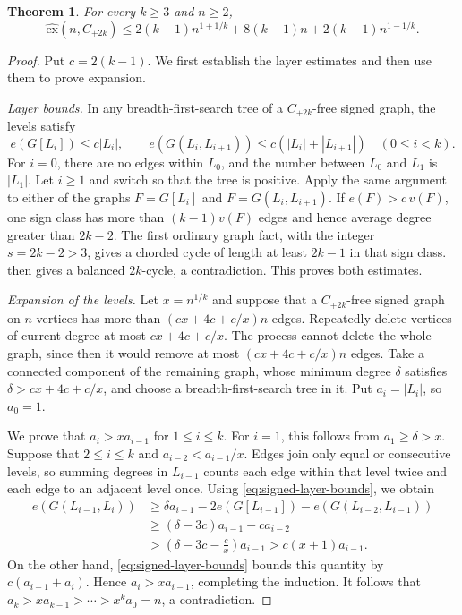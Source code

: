 \documentclass{article}
\newcommand{\ex}{\mathrm{ex}}
\newcommand{\hex}{\widehat{\ex}}
\newtheorem{theorem}{Theorem}[section]
\theoremstyle{definition}
\theoremstyle{remark}
\begin{document}
\begin{theorem}\label{thm:signed-BFS-bound}
For every $k\geq3$ and $n\geq2$,
\[
\hex(n,C_{+2k})\leq
2(k-1)n^{1+1/k}+8(k-1)n+2(k-1)n^{1-1/k}.
\]
\end{theorem}
\begin{proof}
Put $c=2(k-1)$.  We first establish the layer estimates and then use them
to prove expansion.

\emph{Layer bounds.}  In any breadth-first-search tree of a
$C_{+2k}$-free signed graph, the levels satisfy
\begin{equation}\label{eq:signed-layer-bounds}
e(G[L_i])\leq c|L_i|,\qquad
e(G(L_i,L_{i+1}))\leq c(|L_i|+|L_{i+1}|)
\quad(0\leq i<k).
\end{equation}
For $i=0$, there are no edges within $L_0$, and the number between $L_0$
and $L_1$ is $|L_1|$.  Let $i\geq1$ and switch so that the tree is
positive.  Apply the same argument to either of the graphs
$F=G[L_i]$ and $F=G(L_i,L_{i+1})$.  If $e(F)>c\,v(F)$, one sign class
has more than $(k-1)v(F)$ edges and hence average degree greater than
$2k-2$.  The first ordinary graph fact, with the integer $s=2k-2>3$,
gives a chorded cycle of length at least $2k-1$ in that sign class.
 then gives a balanced $2k$-cycle,
a contradiction.  This proves both estimates.

\emph{Expansion of the levels.}  Let $x=n^{1/k}$ and suppose that a
$C_{+2k}$-free signed graph on $n$
vertices has more than $(cx+4c+c/x)n$ edges.  Repeatedly delete vertices
of current degree at most $cx+4c+c/x$.  The process cannot delete the
whole graph, since then it would remove at most $(cx+4c+c/x)n$ edges.
Take a connected component of the remaining graph, whose minimum degree
$\delta$ satisfies $\delta>cx+4c+c/x$, and choose a breadth-first-search
tree in it.  Put $a_i=|L_i|$, so $a_0=1$.

We prove that $a_i>xa_{i-1}$ for $1\leq i\leq k$.  For $i=1$, this
follows from $a_1\geq\delta>x$.  Suppose that $2\leq i\leq k$ and
$a_{i-2}<a_{i-1}/x$.  Edges join only equal or consecutive levels, so
summing degrees in $L_{i-1}$ counts each edge within that level twice and
each edge to an adjacent level once.  Using
\eqref{eq:signed-layer-bounds}, we obtain
\begin{align*}
e(G(L_{i-1},L_i))
&\geq\delta a_{i-1}-2e(G[L_{i-1}])-e(G(L_{i-2},L_{i-1}))\\
&\geq(\delta-3c)a_{i-1}-ca_{i-2}\\
&>\left(\delta-3c-\frac cx\right)a_{i-1}
>c(x+1)a_{i-1}.
\end{align*}
On the other hand, \eqref{eq:signed-layer-bounds} bounds this quantity by
$c(a_{i-1}+a_i)$.  Hence $a_i>xa_{i-1}$, completing the induction.  It
follows that $a_k>xa_{k-1}>\cdots>x^ka_0=n$, a contradiction.
\end{proof}
\end{document}
